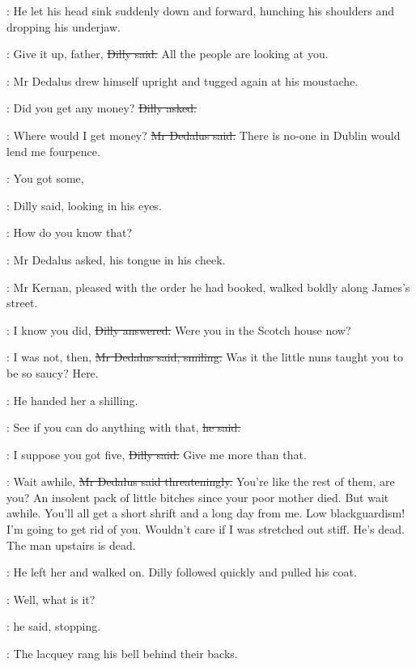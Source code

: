 :
He let his head sink suddenly down and forward,
hunching his shoulders and dropping his underjaw.

\dilly:
Give it up, father,
\sout{Dilly said.}
All the people are looking at you.

:
Mr Dedalus drew himself upright
and tugged again at his moustache.

\dilly:
Did you get any money?
\sout{Dilly asked.}

\simon:
Where would I get money?
\sout{Mr Dedalus said.}
There is no-one in Dublin would lend me fourpence.%

\dilly:
You got some,

:
Dilly said,
looking in his eyes.

\simon:
How do you know that?

:
Mr Dedalus asked,
his tongue in his cheek.

\begin{interject}
    :
    Mr Kernan,
    pleased with the order he had booked,
    walked boldly along James's street.
\end{interject}

\dilly:
I know you did,
\sout{Dilly answered.}
Were you in the Scotch house now?

\simon:
I was not, then,
\sout{Mr Dedalus said, smiling.}
Was it the little nuns taught you to be so saucy?
Here.

:
He handed her a shilling.

\simon:
See if you can do anything with that,
\sout{he said.}

\dilly:
I suppose you got five,
\sout{Dilly said.}
Give me more than that.

\simon:
Wait awhile,
\sout{Mr Dedalus said threateningly.}
You're like the rest of them, are you?
An insolent pack of little bitches since your poor mother died.
But wait awhile.
You'll all get a short shrift and a long day from me.
Low blackguardism!
I'm going to get rid of you.
Wouldn't care if I was stretched out stiff.
He's dead.
The man upstairs is dead.

:
He left her and walked on.
Dilly followed quickly and pulled his coat.

\simon:
Well, what is it?

:
he said, stopping.

:
The lacquey rang his bell behind their backs.


